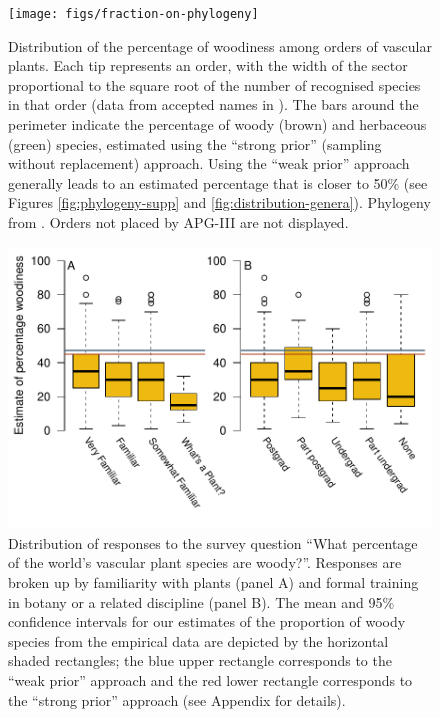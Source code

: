 \documentclass[a4paper,12pt]{article}
\begin{document}
\begin{figure}[p]
  \centering
  \texttt{[image: figs/fraction-on-phylogeny]}
  \caption{Distribution of the percentage of woodiness among orders of
    vascular plants.  Each tip represents an order, with the width of
    the sector proportional to the square root of the number of
    recognised species in that order (data from accepted names in
    \citet{ThePlantList}).  The bars around the perimeter indicate the
    percentage of woody (brown) and herbaceous (green) species,
    estimated using the ``strong prior'' (sampling without
    replacement) approach.  Using the ``weak prior'' approach
    generally leads to an estimated percentage that is closer to 50\%
    (see Figures \ref{fig:phylogeny-supp} and
    \ref{fig:distribution-genera}).  Phylogeny from \citep{Zanne}.
    Orders not placed by APG-III \citep{APG3} are not displayed.}
\label{fig:phylogeny}
\end{figure}


\begin{figure}[p]
  \centering
  \includegraphics{figs/survey-results}
  \caption{Distribution of responses to the survey question ``What
    percentage of the world's vascular plant species are
    woody?''. Responses are broken up by familiarity with plants
    (panel A) and formal training in botany or a related discipline
    (panel B). The mean and 95\% confidence intervals for our
    estimates of the proportion of woody species from the empirical
    data are depicted by the horizontal shaded rectangles; the blue
    upper rectangle corresponds to the ``weak prior'' approach and the
    red lower rectangle corresponds to the ``strong prior'' approach
    (see Appendix for details).}
  \label{fig:survey}
\end{figure}
\end{document}
